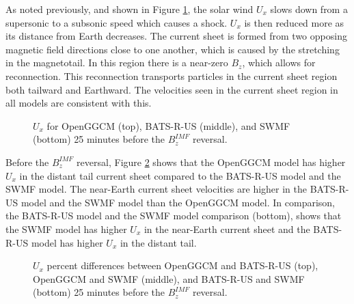 As noted previously, and shown in Figure \ref{fig:UxBeforeFlip}, the solar wind
$U_x$ slows down from a supersonic to a subsonic speed which causes a shock.
$U_x$ is then reduced more as its distance from Earth decreases.
The current sheet is formed from two opposing magnetic field directions close to
one another, which is caused by the stretching in the
magnetotail. In this region there is a near-zero $B_z$, which allows for
reconnection. This reconnection transports particles in the current sheet region
both tailward and Earthward. The velocities seen in the current sheet region in
all models are consistent with this.
\begin{figure}
	\centering
	\caption{$U_x$ for OpenGGCM (top), BATS-R-US (middle), and SWMF (bottom) 25
	minutes before the $B_z^{IMF}$ reversal.}
	\figSpace
	\label{fig:UxBeforeFlip}
\end{figure}

Before the $B_z^{IMF}$ reversal, Figure \ref{fig:UxdiffBeforeFlip} shows that the
OpenGGCM model has higher $U_x$ in the distant tail current sheet compared to
the BATS-R-US model and the SWMF model. The near-Earth current sheet velocities
are higher in the BATS-R-US model and the SWMF model than the OpenGGCM model. In
comparison, the BATS-R-US model and the SWMF model comparison (bottom), shows
that the SWMF model has higher $U_x$ in the near-Earth current sheet and the
BATS-R-US model has higher $U_x$ in the distant tail.
\begin{figure}
	\centering
	\caption{$U_x$ percent differences between OpenGGCM and
	BATS-R-US (top), OpenGGCM and SWMF (middle), and BATS-R-US and SWMF (bottom)
	25 minutes before the $B_z^{IMF}$ reversal.}
	\figSpace
	\label{fig:UxdiffBeforeFlip}
\end{figure}

